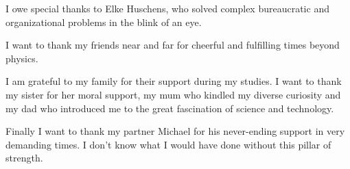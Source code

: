 	I owe special thanks to Elke Huschens, who solved complex bureaucratic and organizational problems in the blink of an eye.

	I want to thank my friends near and far for cheerful and fulfilling times beyond physics. 

	I am grateful to my family for their support during my studies. I want to thank my sister for her moral support, my mum who kindled my diverse curiosity and my dad who introduced me to the great fascination of science and technology.
	
	Finally I want to thank my partner Michael for his never-ending support in very demanding times. I don't know what I would have done without this pillar of strength.

	\blindtext

\vfill